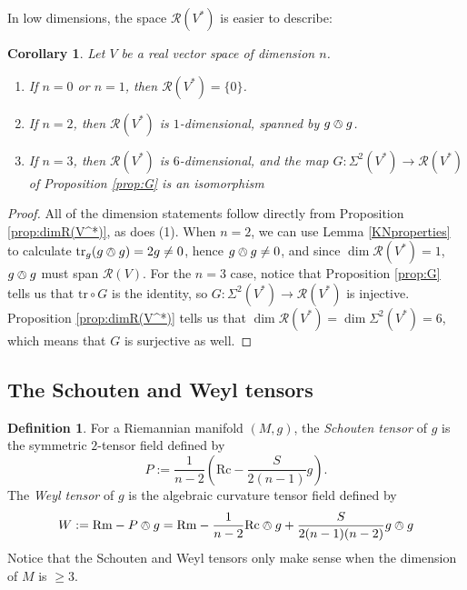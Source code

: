 \documentclass{amsart}
\numberwithin{equation}{section}
\def\~#1{\mathscr{#1}}
\newcommand{\tr}{\mathrm{tr}}
\newcommand{\Rc}{\mathrm{Rc}}
\newcommand{\Rm}{\mathrm{Rm}}
\theoremstyle{plain}
\newtheorem{cor}[thm]{Corollary}
\theoremstyle{definition}
\newtheorem{defn}[thm]{Definition}
\theoremstyle{remark}
\begin{document}
In low dimensions, the space $\~R(V^*)$ is easier to describe:
\begin{cor}\label{cor:R(V^*)dim0-3}
Let $V$ be a real vector space of dimension $n$.
\begin{enumerate}
    \item If $n=0$ or $n=1$, then $\~R(V^*) = \{0\}$.
    \item If $n = 2$, then $\~R(V^*)$ is $1$-dimensional, spanned by $g \owedge g$.
    \item If $n=3$, then $\~R(V^*)$ is $6$-dimensional, and the map $G: \Sigma^2(V^*) \to \~R(V^*)$ of Proposition \ref{prop:G} is an isomorphism 
\end{enumerate}
\end{cor}
\begin{proof}
    All of the dimension statements follow directly from Proposition \ref{prop:dimR(V^*)}, as does (1). When $n = 2$, we can use Lemma \ref{KNproperties} to calculate $\tr_g(g \owedge g) = 2g \ne 0$, hence $g \owedge g \ne 0$, and since $\dim \~R(V^*) = 1$, $g \owedge g$ must span $\~R(V)$. For the $n=3$ case, notice that Proposition \ref{prop:G} tells us that $\tr \circ G$ is the identity, so $G: \Sigma^2(V^*) \to \~R(V^*)$ is injective. Proposition \ref{prop:dimR(V^*)} tells us that $\dim \~R(V^*) = \dim \Sigma^2(V^*) = 6$, which means that $G$ is surjective as well.
\end{proof}


\subsection{The Schouten and Weyl tensors}

\begin{defn}\label{defn:W}
    For a Riemannian manifold $(M, g)$, the \emph{Schouten tensor} of $g$ is the symmetric $2$-tensor field defined by
    \[P := \frac{1}{n-2}\left(\Rc - \frac{S}{2(n-1)}g\right).\]
    The \emph{Weyl tensor} of $g$ is the algebraic curvature tensor field defined by
    \begin{equation}\label{eq:W}
        W := \Rm - P \owedge g 
          = \Rm - \frac{1}{n-2}\Rc \owedge g + \frac{S}{2(n-1)(n-2)}g \owedge g 
    \end{equation}
    Notice that the Schouten and Weyl tensors only make sense when the dimension of $M$ is $\ge 3$.
\end{defn}
\end{document}

